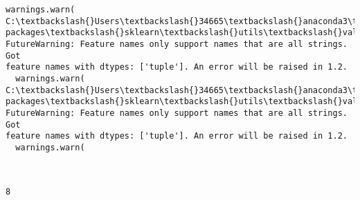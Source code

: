 \documentclass[11pt]{article}
\begin{document}
\begin{Verbatim}[commandchars=\\\{\}]
  warnings.warn(
C:\textbackslash{}Users\textbackslash{}34665\textbackslash{}anaconda3\textbackslash{}lib\textbackslash{}site-packages\textbackslash{}sklearn\textbackslash{}utils\textbackslash{}validation.py:1688:
FutureWarning: Feature names only support names that are all strings. Got
feature names with dtypes: ['tuple']. An error will be raised in 1.2.
  warnings.warn(
C:\textbackslash{}Users\textbackslash{}34665\textbackslash{}anaconda3\textbackslash{}lib\textbackslash{}site-packages\textbackslash{}sklearn\textbackslash{}utils\textbackslash{}validation.py:1688:
FutureWarning: Feature names only support names that are all strings. Got
feature names with dtypes: ['tuple']. An error will be raised in 1.2.
  warnings.warn(
    \end{Verbatim}

    \begin{center}
    \end{center}
    { \hspace*{\fill} \\}
    
    \begin{Verbatim}[commandchars=\\\{\}]
8
    \end{Verbatim}
\end{document}
